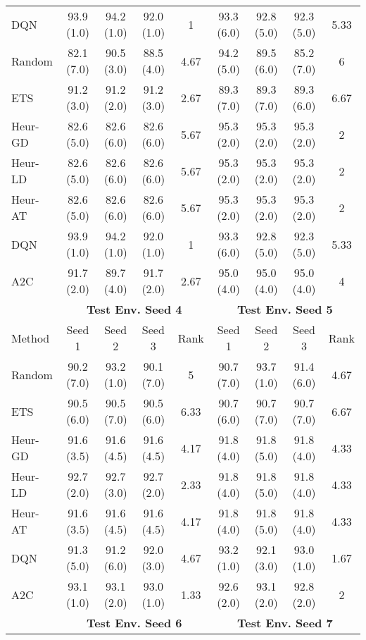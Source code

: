 \begin{table}[t]
{\begin{tabular}{lcccccccc}
DQN       & 93.9 (1.0)  & 94.2 (1.0)  & 92.0 (1.0) & 1    & 93.3 (6.0)  & 92.8 (5.0)  & 92.3 (5.0) & 5.33 \\
Random    & 82.1 (7.0)  & 90.5 (3.0)  & 88.5 (4.0) & 4.67 & 94.2 (5.0)  & 89.5 (6.0)  & 85.2 (7.0) & 6    \\
ETS       & 91.2 (3.0)  & 91.2 (2.0)  & 91.2 (3.0) & 2.67 & 89.3 (7.0)  & 89.3 (7.0)  & 89.3 (6.0) & 6.67 \\
Heur-GD   & 82.6 (5.0)  & 82.6 (6.0)  & 82.6 (6.0) & 5.67 & 95.3 (2.0)  & 95.3 (2.0)  & 95.3 (2.0) & 2    \\
Heur-LD   & 82.6 (5.0)  & 82.6 (6.0)  & 82.6 (6.0) & 5.67 & 95.3 (2.0)  & 95.3 (2.0)  & 95.3 (2.0) & 2    \\
Heur-AT   & 82.6 (5.0)  & 82.6 (6.0)  & 82.6 (6.0) & 5.67 & 95.3 (2.0)  & 95.3 (2.0)  & 95.3 (2.0) & 2    \\
DQN       & 93.9 (1.0)  & 94.2 (1.0)  & 92.0 (1.0) & 1    & 93.3 (6.0)  & 92.8 (5.0)  & 92.3 (5.0) & 5.33 \\
A2C       & 91.7 (2.0)  & 89.7 (4.0)  & 91.7 (2.0) & 2.67 & 95.0 (4.0)  & 95.0 (4.0)  & 95.0 (4.0) & 4    \\ \midrule
\textbf{} & \multicolumn{4}{c}{\textbf{Test Env. Seed 4}} & \multicolumn{4}{c}{\textbf{Test Env. Seed 5}} \\
\cmidrule(lr){2-5} \cmidrule(lr){6-9} 
Method    & Seed 1      & Seed 2      & Seed 3     & Rank & Seed 1      & Seed 2      & Seed 3     & Rank \\ \midrule
Random    & 90.2 (7.0)  & 93.2 (1.0)  & 90.1 (7.0) & 5    & 90.7 (7.0)  & 93.7 (1.0)  & 91.4 (6.0) & 4.67 \\
ETS       & 90.5 (6.0)  & 90.5 (7.0)  & 90.5 (6.0) & 6.33 & 90.7 (6.0)  & 90.7 (7.0)  & 90.7 (7.0) & 6.67 \\
Heur-GD   & 91.6 (3.5)  & 91.6 (4.5)  & 91.6 (4.5) & 4.17 & 91.8 (4.0)  & 91.8 (5.0)  & 91.8 (4.0) & 4.33 \\
Heur-LD   & 92.7 (2.0)  & 92.7 (3.0)  & 92.7 (2.0) & 2.33 & 91.8 (4.0)  & 91.8 (5.0)  & 91.8 (4.0) & 4.33 \\
Heur-AT   & 91.6 (3.5)  & 91.6 (4.5)  & 91.6 (4.5) & 4.17 & 91.8 (4.0)  & 91.8 (5.0)  & 91.8 (4.0) & 4.33 \\
DQN       & 91.3 (5.0)  & 91.2 (6.0)  & 92.0 (3.0) & 4.67 & 93.2 (1.0)  & 92.1 (3.0)  & 93.0 (1.0) & 1.67 \\
A2C       & 93.1 (1.0)  & 93.1 (2.0)  & 93.0 (1.0) & 1.33 & 92.6 (2.0)  & 93.1 (2.0)  & 92.8 (2.0) & 2    \\ \midrule
\textbf{} & \multicolumn{4}{c}{\textbf{Test Env. Seed 6}} & \multicolumn{4}{c}{\textbf{Test Env. Seed 7}} \\

\end{tabular}}
\end{table}

